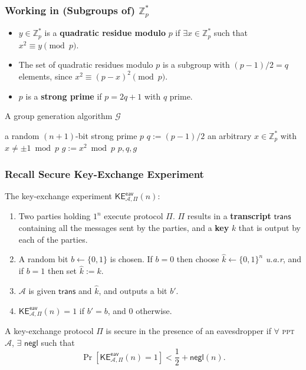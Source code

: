 \begin{frame}\frametitle{Working in (Subgroups of) $\mathbb{Z}^*_p$}
\begin{itemize}
\item $y \in \mathbb{Z}^*_p$ is a \textbf{quadratic residue modulo} $p$ if $\exists x \in \mathbb{Z}^*_p$ such that $x^2 \equiv y \pmod p$. 
\item The set of quadratic residues modulo $p$ is a subgroup with $(p-1)/2 = q$ elements, since $x^2 \equiv (p-x)^2 \pmod p$.
\item $p$ is a \textbf{strong prime} if $p=2q+1$ with $q$ prime.
\end{itemize}
\begin{algorithm}[H]
\DontPrintSemicolon
\caption{A group generation algorithm $\mathcal{G}$}
\BlankLine
\KwG a random $(n+1)$-bit strong prime $p$\;
$q := (p-1)/2$\;
\KwC an arbitrary $x \in \mathbb{Z}^*_p$ with $x \neq \pm 1 \bmod p$\;
$g := x^2 \bmod p$\;
\Return $p,q,g$
\end{algorithm}
\end{frame}
\begin{frame}\frametitle{Recall Secure Key-Exchange Experiment}
The key-exchange experiment $\mathsf{KE}^{\mathsf{eav}}_{\mathcal{A},\Pi}(n)$:
\begin{enumerate}
\item Two parties holding $1^n$ execute protocol $\Pi$. $\Pi$ results in a \textbf{transcript} $\mathsf{trans}$ containing all the messages sent by the parties, and a \textbf{key} $k$ that is output by each of the parties.
\item A random bit $b \gets \{0,1\}$ is chosen. If $b=0$ then choose $\hat{k} \gets \{0,1\}^n$ \emph{u.a.r}, and if $b=1$ then set $\hat{k} :=k$.
\item $\mathcal{A}$ is given $\mathsf{trans}$ and $\hat{k}$, and outputs a bit $b'$.
\item $\mathsf{KE}^{\mathsf{eav}}_{\mathcal{A},\Pi}(n)=1$ if $b'=b$, and 0 otherwise. 
\end{enumerate}
\begin{definition}
A key-exchange protocol $\Pi$ is secure in the presence of an eavesdropper if $\forall$ \textsc{ppt} $\mathcal{A}$, $\exists$ $\mathsf{negl}$ such that
\[ \Pr[\mathsf{KE}^{\mathsf{eav}}_{\mathcal{A},\Pi}(n) = 1] < \frac{1}{2} + \mathsf{negl}(n). \]
\end{definition}
\end{frame}
